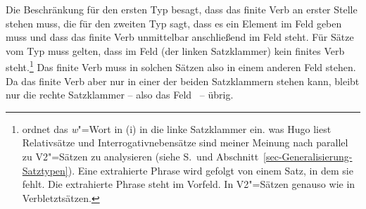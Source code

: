 \ex\label{v2-clause-type}  \impl {}
\ex\label{subord-clause-types}  \impl {}
\zl{}
Die Beschränkung für den ersten Typ besagt, dass das finite Verb an erster Stelle stehen muss,
die für den zweiten Typ sagt, dass es ein Element im Feld  geben muss und dass das
finite Verb unmittelbar anschließend im Feld  steht. Für Sätze vom Typ
 muss gelten, dass im Feld  (der linken Satzklammer) kein finites
Verb steht.\footnote{%
  \citet[]{Kathol2001a} ordnet das \emph{w}"=Wort in (i) in die linke Satzklammer ein.
\ea
was Hugo liest
\z
Relativsätze und Interrogativnebensätze sind meiner Meinung nach parallel zu V2"=Sätzen zu
analysieren (siehe S.\,\pageref{Seite-Relativsätze-Interrogativnebensätze} und Abschnitt~\ref{sec-Generalisierung-Satztypen}). Eine extrahierte Phrase
wird gefolgt von einem Satz, in dem sie fehlt. Die extrahierte Phrase steht im Vorfeld. In
V2"=Sätzen genauso wie in Verbletztsätzen.
} Das finite Verb muss in solchen Sätzen also in einem anderen Feld stehen. Da das
finite Verb aber nur in einer der beiden Satzklammern stehen kann, bleibt nur die rechte Satzklammer
-- also das Feld~ -- übrig.

